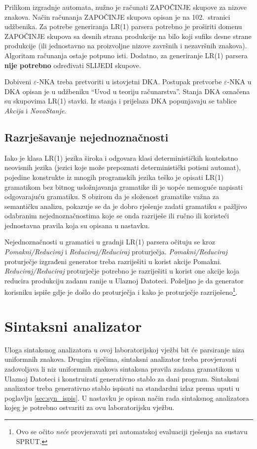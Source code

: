 \documentclass[times, 12pt, utf8]{book}
\begin{document}
Prilikom izgradnje automata, nužno je računati ZAPOČINJE skupove za nizove znakova.
Način računanja ZAPOČINJE skupova opisan je na 102.~stranici udžbenika.
Za potrebe generiranja LR(1) parsera potrebno je proširiti domenu ZAPOČINJE skupova sa desnih strana produkcije na bilo koji sufiks desne strane produkcije (ili jednostavno na proizvoljne nizove završnih i nezavršnih znakova).
Algoritam računanja ostaje potpuno isti.
Dodatno, za generiranje LR(1) parsera \textbf{nije potrebno} određivati SLIJEDI skupove.

Dobiveni $\varepsilon$-NKA treba pretvoriti u istovjetni DKA.
Postupak pretvorbe $\varepsilon$-NKA u DKA opisan je u udžbeniku “Uvod u teoriju računarstva”.
Stanja DKA označena su skupovima LR(1) stavki.
Iz stanja i prijelaza DKA popunjavaju se tablice {\em Akcija} i {\em NovoStanje}.

\subsection{Razrješavanje nejednoznačnosti}
Iako je klasa LR(1) jezika široka i odgovara klasi determinističkih kontekstno neovisnih jezika (jezici koje može prepoznati deterministički potisni automat), pojedine konstrukte iz mnogih programskih jezika teško je opisati LR(1) gramatikom bez bitnog usložnjavanja gramatike ili je uopće nemoguće napisati odgovarajuću gramatiku.
S obzirom da je složenost gramatike važna za semantičku analizu, pokazuje se da je dobro rješenje zadati gramatiku s pažljivo odabranim nejednoznačnostima koje se onda razriješe ili ručno ili koristeći jednostavna pravila koja su opisana u nastavku.

Nejednoznačnosti u gramatici u gradnji LR(1) parsera očituju se kroz {\em Pomakni/Reduciraj} i {\em Reduciraj/Reduciraj} proturječja.
{\em Pomakni/Reduciraj} proturječje izgrađeni generator treba razriješiti u korist akcije Pomakni.
{\em Reduciraj/Reduciraj} proturječje potrebno je razriješiti u korist one akcije koja reducira produkciju zadanu ranije u Ulaznoj Datoteci.
Poželjno je da generator korisniku ispiše gdje je došlo do proturječja i kako je proturječje razriješeno\footnote{Ovo se očito \emph{neće} provjeravati pri automatskoj evaluaciji rješenja na sustavu SPRUT.}.

\section{Sintaksni analizator}
Uloga sintaksnog analizatora u ovoj laboratorijskoj vježbi bit će parsiranje niza uniformnih znakova.
Drugim riječima, sintaksni analizator treba provjeravati zadovoljava li niz uniformnih znakova sintaksna pravila zadana gramatikom u Ulaznoj Datoteci i konstruirati generativno stablo za dani program.
Sintaksni analizator treba generativno stablo ispisati na standardni izlaz prema uputi u poglavlju \ref{sec:syn_ispis}.
U nastavku je opisan način rada sintaksnog analizatora kojeg je potrebno ostvariti za ovu laboratorijsku vježbu.
\end{document}
